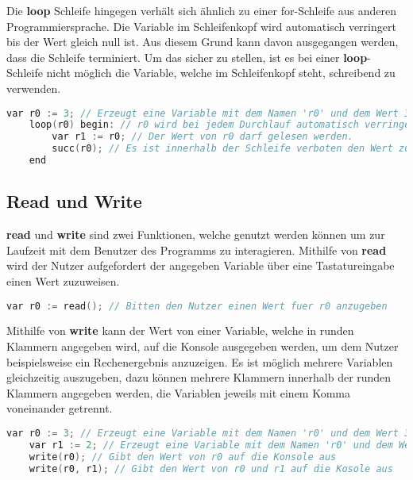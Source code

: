 Die \textbf{loop} Schleife hingegen verhält sich ähnlich zu einer for-Schleife aus anderen Programmiersprache. Die Variable im Schleifenkopf wird automatisch verringert bis der Wert gleich null ist. Aus diesem Grund kann davon ausgegangen werden, dass die Schleife terminiert. Um das sicher zu stellen, ist es bei einer \textbf{loop}-Schleife nicht möglich die Variable, welche im Schleifenkopf steht, schreibend zu verwenden. 

\begin{lstlisting}[language=c, caption=loop-Schleife in While, label={lst:while-loop}]
	var r0 := 3; // Erzeugt eine Variable mit dem Namen 'r0' und dem Wert 3
	loop(r0) begin: // r0 wird bei jedem Durchlauf automatisch verringert
		var r1 := r0; // Der Wert von r0 darf gelesen werden.
		succ(r0); // Es ist innerhalb der Schleife verboten den Wert zu aendern!
	end
\end{lstlisting}

\subsection{Read und Write}
\textbf{read} und \textbf{write} sind zwei Funktionen, welche genutzt werden können um zur Laufzeit mit dem Benutzer des Programms zu interagieren. Mithilfe von \textbf{read} wird der Nutzer aufgefordert der angegeben Variable über eine Tastatureingabe einen Wert zuzuweisen. 

\begin{lstlisting}[language=c, caption=read in While, label={lst:while-var-read}]
	var r0 := read(); // Bitten den Nutzer einen Wert fuer r0 anzugeben
\end{lstlisting}

Mithilfe von \textbf{write} kann der Wert von einer Variable, welche in runden Klammern angegeben wird, auf die Konsole ausgegeben werden, um dem Nutzer beispielsweise ein Rechenergebnis anzuzeigen. Es ist möglich mehrere Variablen gleichzeitig auszugeben, dazu können mehrere Klammern innerhalb der runden Klammern angegeben werden, die Variablen jeweils mit einem Komma voneinander getrennt. 

\begin{lstlisting}[language=c, caption=write in While, label={lst:while-write}]
	var r0 := 3; // Erzeugt eine Variable mit dem Namen 'r0' und dem Wert 3
	var r1 := 2; // Erzeugt eine Variable mit dem Namen 'r0' und dem Wert 3
	write(r0); // Gibt den Wert von r0 auf die Konsole aus
	write(r0, r1); // Gibt den Wert von r0 und r1 auf die Kosole aus
\end{lstlisting}

